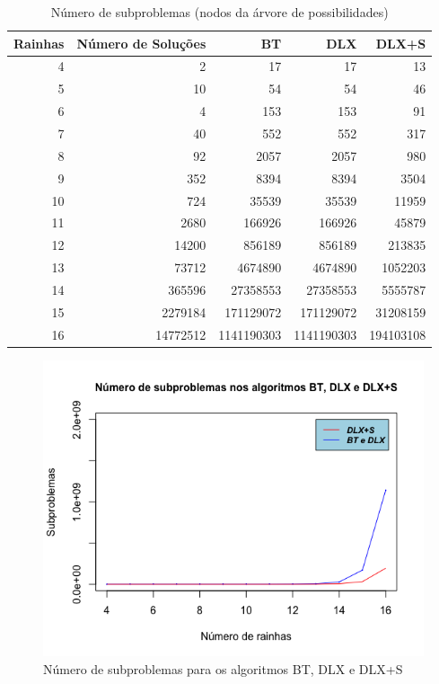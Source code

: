 \documentclass{article}
\begin{document}
\begin{center}
  \begin{table}
  \centering
  \begin{tabular}{ r r r r r }
    Rainhas & Número de Soluções & BT & DLX & DLX+S \\
  \hline
    4  & 2        & 17         & 17         & 13 \\
    5  & 10       & 54         & 54         & 46 \\
    6  & 4        & 153        & 153        & 91 \\
    7  & 40       & 552        & 552        & 317 \\
    8  & 92       & 2057       & 2057       & 980 \\
    9  & 352      & 8394       & 8394       & 3504 \\
    10 & 724      & 35539      & 35539      & 11959 \\
    11 & 2680     & 166926     & 166926     & 45879 \\
    12 & 14200    & 856189     & 856189     & 213835 \\
    13 & 73712    & 4674890    & 4674890    & 1052203 \\
    14 & 365596   & 27358553   & 27358553   & 5555787 \\
    15 & 2279184  & 171129072  & 171129072  & 31208159 \\
    16 & 14772512 & 1141190303 & 1141190303 & 194103108 \\
  \end{tabular}
  \caption{Número de subproblemas (nodos da árvore de possibilidades)}
  \label{tab:tab_3}
  \end{table}
\end{center}

\begin{figure}
  \includegraphics[width=\linewidth]{subproblems.png}
  \caption{Número de subproblemas para os algoritmos BT, DLX e DLX+S}
  \label{fig:subproblems}
\end{figure}
\end{document}
